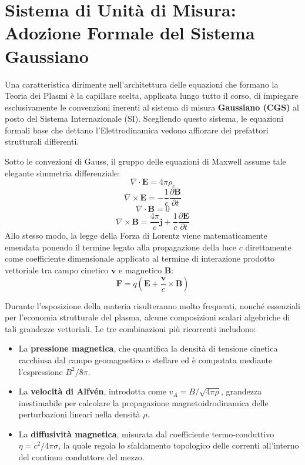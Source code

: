 \section{Sistema di Unità di Misura: Adozione Formale del Sistema Gaussiano}

Una caratteristica dirimente nell'architettura delle equazioni che formano la Teoria dei Plasmi è la capillare scelta, applicata lungo tutto il corso, di impiegare esclusivamente le convenzioni inerenti al sistema di misura \textbf{Gaussiano (CGS)} al posto del Sistema Internazionale (SI). Scegliendo questo sistema, le equazioni formali base che dettano l'Elettrodinamica vedono affiorare dei prefattori strutturali differenti.

Sotto le convezioni di Gauss, il gruppo delle equazioni di Maxwell assume tale elegante simmetria differenziale:
\begin{equation}
\nabla \cdot \mathbf{E} = 4\pi \rho_c
\end{equation}
\begin{equation}
\nabla \times \mathbf{E} = -\frac{1}{c} \frac{\partial \mathbf{B}}{\partial t}
\end{equation}
\begin{equation}
\nabla \cdot \mathbf{B} = 0
\end{equation}
\begin{equation}
\nabla \times \mathbf{B} = \frac{4\pi}{c} \mathbf{j} + \frac{1}{c} \frac{\partial \mathbf{E}}{\partial t}
\end{equation}
Allo stesso modo, la legge della Forza di Lorentz viene matematicamente emendata ponendo il termine legato alla propagazione della luce $c$ direttamente come coefficiente dimensionale applicato al termine di interazione prodotto vettoriale tra campo cinetico $\mathbf{v}$ e magnetico $\mathbf{B}$:
\begin{equation}
\mathbf{F} = q \left( \mathbf{E} + \frac{\mathbf{v}}{c} \times \mathbf{B} \right)
\end{equation}

Durante l'esposizione della materia risulteranno molto frequenti, nonché essenziali per l'economia strutturale del plasma, alcune composizioni scalari algebriche di tali grandezze vettoriali. Le tre combinazioni più ricorrenti includono:
\begin{itemize}
\item La \textbf{pressione magnetica}, che quantifica la densità di tensione cinetica racchiusa dal campo geomagnetico o stellare ed è computata mediante l'espressione $B^2/8\pi$.
\item La \textbf{velocità di Alfvén}, introdotta come $v_A = B / \sqrt{4\pi \rho}$, grandezza inestimabile per calcolare la propagazione magnetoidrodinamica delle perturbazioni lineari nella densità $\rho$.
\item La \textbf{diffusività magnetica}, misurata dal coefficiente termo-conduttivo $\eta = c^2/4\pi\sigma$, la quale regola lo sfaldamento topologico delle correnti all'interno del continuo conduttore del mezzo.
\end{itemize}

